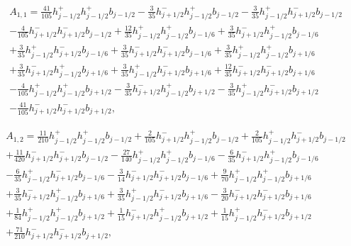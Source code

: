 \documentclass[12pt]{article}
\begin{document}
\begin{multline*} A_{1,1} = \frac{41}{105} h_{j-1/2}^+ h_{j-1/2}^+ b_{j-1/2}-\frac{3}{35} h_{j+1/2}^- h_{j-1/2}^+ b_{j-1/2}-\frac{3}{35} h_{j-1/2}^+ h_{j+1/2}^- b_{j-1/2}\\-\frac{4}{105} h_{j+1/2}^- h_{j+1/2}^- b_{j-1/2}+\frac{12}{35} h_{j-1/2}^+ h_{j-1/2}^+ b_{j-1/6}+\frac{3}{35} h_{j+1/2}^- h_{j-1/2}^+ b_{j-1/6}\\+\frac{3}{35} h_{j-1/2}^+ h_{j+1/2}^- b_{j-1/6}+\frac{3}{35} h_{j+1/2}^- h_{j+1/2}^- b_{j-1/6}+\frac{3}{35} h_{j-1/2}^+ h_{j-1/2}^+ b_{j+1/6}\\+\frac{3}{35} h_{j+1/2}^- h_{j-1/2}^+ b_{j+1/6}+\frac{3}{35} h_{j-1/2}^+ h_{j+1/2}^- b_{j+1/6}+\frac{12}{35} h_{j+1/2}^- h_{j+1/2}^- b_{j+1/6}\\-\frac{4}{105} h_{j-1/2}^+ h_{j-1/2}^+ b_{j+1/2}-\frac{3}{35} h_{j+1/2}^- h_{j-1/2}^+ b_{j+1/2}-\frac{3}{35} h_{j-1/2}^+ h_{j+1/2}^- b_{j+1/2}\\-\frac{41}{105} h_{j+1/2}^- h_{j+1/2}^- b_{j+1/2}, \end{multline*}

\begin{multline*} A_{1,2} = \frac{11}{210} h_{j-1/2}^+ h_{j-1/2}^+ b_{j-1/2}+\frac{2}{105} h_{j+1/2}^- h_{j-1/2}^+ b_{j-1/2}+\frac{2}{105} h_{j-1/2}^+ h_{j+1/2}^- b_{j-1/2}\\+\frac{11}{420} h_{j+1/2}^- h_{j+1/2}^- b_{j-1/2}-\frac{27}{140} h_{j-1/2}^+ h_{j-1/2}^+ b_{j-1/6}-\frac{6}{35} h_{j+1/2}^- h_{j-1/2}^+ b_{j-1/6}\\-\frac{6}{35} h_{j-1/2}^+ h_{j+1/2}^- b_{j-1/6}-\frac{3}{14} h_{j+1/2}^- h_{j+1/2}^- b_{j-1/6}+\frac{9}{70} h_{j-1/2}^+ h_{j-1/2}^+ b_{j+1/6}\\+\frac{3}{35} h_{j+1/2}^- h_{j-1/2}^+ b_{j+1/6}+\frac{3}{35} h_{j-1/2}^+ h_{j+1/2}^- b_{j+1/6}-\frac{3}{20} h_{j+1/2}^- h_{j+1/2}^- b_{j+1/6}\\+\frac{1}{84} h_{j-1/2}^+ h_{j-1/2}^+ b_{j+1/2}+\frac{1}{15} h_{j+1/2}^- h_{j-1/2}^+ b_{j+1/2}+\frac{1}{15} h_{j-1/2}^+ h_{j+1/2}^- b_{j+1/2}\\+\frac{71}{210} h_{j+1/2}^- h_{j+1/2}^- b_{j+1/2}, \end{multline*}
\end{document}

